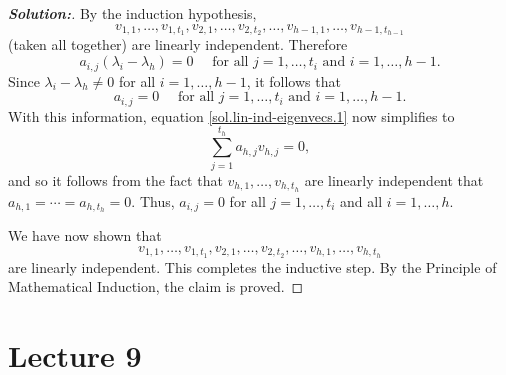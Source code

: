 \documentclass[a4paper]{amsart}
\theoremstyle{definition}
\newenvironment{solution}{\begin{proof}[\textbf{Solution:}] \vphantom{u}}{\end{proof}}
\begin{document}
\begin{solution}
 By the induction hypothesis,
 \[
 v_{1,1}, \ldots, v_{1,t_1},
 v_{2,1}, \ldots, v_{2,t_2},
 \ldots,
 v_{h-1,1}, \ldots, v_{h-1,t_{h-1}}
 \]
 (taken all together) are linearly independent. Therefore
 \[
 a_{i,j}(\lambda_i - \lambda_h) = 0 \quad \text{~for all~} j = 1,
 \ldots, t_i
 \text{~and~} i = 1, \ldots, h-1.
 \]
 Since $\lambda_i - \lambda_h \neq 0$ for all $i = 1, \ldots, h-1$, it follows that
 \[
 a_{i,j} = 0 \quad \text{~for all~} j = 1, \ldots, t_i
 \text{~and~} i = 1, \ldots, h-1.
 \]
 With this information, equation \eqref{sol.lin-ind-eigenvecs.1} now simplifies to
 \[
 \sum_{j=1}^{t_h} a_{h,j}v_{h,j} = 0,
 \]
 and so it follows from the fact that $v_{h,1}, \ldots, v_{h,t_h}$ are
 linearly independent that $a_{h,1}= \cdots = a_{h,t_h} = 0$.
 Thus, $a_{i,j} = 0$ for all $j = 1, \ldots, t_i$
 and all $i = 1, \ldots, h$.

 We have now shown that
 \[
 v_{1,1}, \ldots, v_{1,t_1},
 v_{2,1}, \ldots, v_{2,t_2},
 \ldots,
 v_{h,1}, \ldots, v_{h,t_h}
 \]
 are linearly independent. This completes the inductive step. By the
 Principle of
 Mathematical Induction, the claim is proved.

\end{solution}

\section{Lecture 9}
\end{document}
